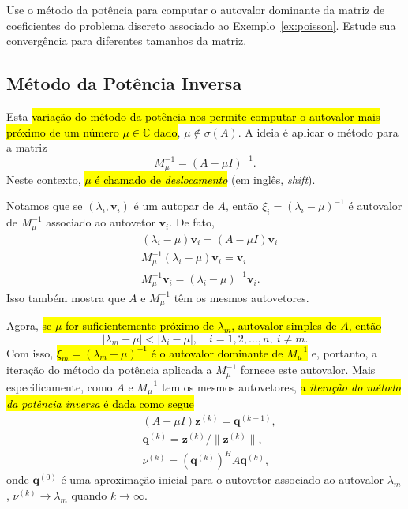 \begin{exer}
  Use o método da potência para computar o autovalor dominante da matriz de coeficientes do problema discreto associado ao Exemplo~\ref{ex:poisson}. Estude sua convergência para diferentes tamanhos da matriz.
\end{exer}

\subsection{Método da Potência Inversa}
\badgeRevisar

Esta \hl{variação do método da potência nos permite computar o autovalor mais próximo de um número $\mu\in\mathbb{C}$ dado}, $\mu\not\in\sigma(A)$. A ideia é aplicar o método para a matriz
\begin{equation}
  M_\mu^{-1} = (A-\mu I)^{-1}.
\end{equation}
Neste contexto, \hl{$\mu$ é chamado de \emph{deslocamento}} (em inglês, {\it shift}).

Notamos que se $\left(\lambda_i, \pmb{v}_i\right)$ é um autopar de $A$, então $\xi_i=(\lambda_i-\mu)^{-1}$ é autovalor de $M_\mu^{-1}$ associado ao autovetor $\pmb{v}_i$. De fato,
\begin{align}
  & (\lambda_i - \mu) \pmb{v}_i = (A-\mu I)\pmb{v}_i \\
  & M_\mu^{-1}(\lambda_i-\mu)\pmb{v}_i = \pmb{v}_i \\
  & M_\mu^{-1}\pmb{v}_i = (\lambda_i-\mu)^{-1} \pmb{v}_i.
\end{align}
Isso também mostra que $A$ e $M_\mu^{-1}$ têm os mesmos autovetores.

Agora, \hl{se $\mu$ for suficientemente próximo de $\lambda_m$, autovalor simples de $A$, então}
\begin{equation}
  |\lambda_m-\mu| < |\lambda_i-\mu|,\quad i=1,2,\dotsc,n,~i\neq m.
\end{equation}
Com isso, \hl{$\xi_m=(\lambda_m-\mu)^{-1}$ é o autovalor dominante de $M_\mu^{-1}$} e, portanto, a iteração do método da potência aplicada a $M_\mu^{-1}$ fornece este autovalor. Mais especificamente, como $A$ e $M_\mu^{-1}$ tem os  mesmos autovetores, \hl{a \emph{iteração do método da potência inversa} é dada como segue}
\begin{align}
  & (A-\mu I)\pmb{z}^{(k)} = \pmb{q}^{(k-1)}, \label{eq:slmpi} \\
  & \pmb{q}^{(k)} = \pmb{z}^{(k)}/\|\pmb{z}^{(k)}\|, \\
  & \nu^{(k)} = (\pmb{q}^{(k)})^H A \pmb{q}^{(k)},
\end{align}
onde $\pmb{q}^{(0)}$ é uma aproximação inicial para o autovetor associado ao autovalor $\lambda_m$, $\nu^{(k)}\to \lambda_m$ quando $k\to \infty$.

